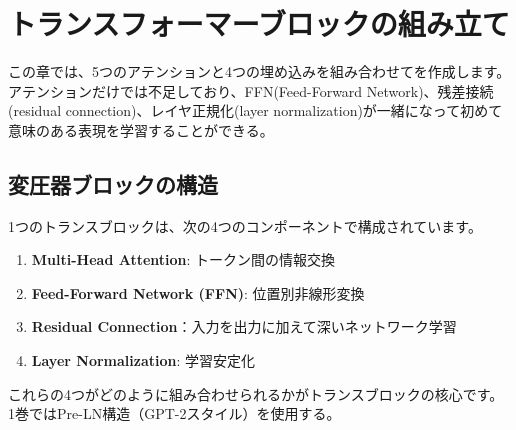 \chapter{トランスフォーマーブロックの組み立て}
\label{ch:transformer_block}

この章では、5つのアテンションと4つの埋め込みを組み合わせてを作成します。アテンションだけでは不足しており、FFN(Feed-Forward Network)、残差接続(residual connection)、レイヤ正規化(layer normalization)が一緒になって初めて意味のある表現を学習することができる。

\section{変圧器ブロックの構造}

1つのトランスブロックは、次の4つのコンポーネントで構成されています。

\begin{enumerate}
\item\textbf{Multi-Head Attention}: トークン間の情報交換
\item\textbf{Feed-Forward Network (FFN)}: 位置別非線形変換
\item\textbf{Residual Connection}：入力を出力に加えて深いネットワーク学習
\item\textbf{Layer Normalization}: 学習安定化
\end{enumerate}

これらの4つがどのように組み合わせられるかがトランスブロックの核心です。 1巻ではPre-LN構造（GPT-2スタイル）を使用する。

